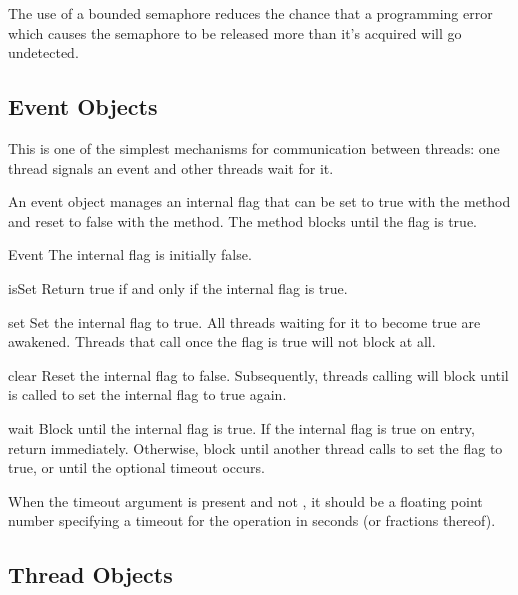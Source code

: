 The use of a bounded semaphore reduces the chance that a programming error
which causes the semaphore to be released more than it's acquired will go
undetected.


\subsection{Event Objects \label{event-objects}}

This is one of the simplest mechanisms for communication between
threads: one thread signals an event and other threads wait for it.

An event object manages an internal flag that can be set to true with
the  method and reset to false with the 
method.  The  method blocks until the flag is true.


\begin{classdesc}{Event}{}
The internal flag is initially false.
\end{classdesc}

\begin{methoddesc}{isSet}{}
Return true if and only if the internal flag is true.
\end{methoddesc}

\begin{methoddesc}{set}{}
Set the internal flag to true.
All threads waiting for it to become true are awakened.
Threads that call  once the flag is true will not block
at all.
\end{methoddesc}

\begin{methoddesc}{clear}{}
Reset the internal flag to false.
Subsequently, threads calling  will block until
 is called to set the internal flag to true again.
\end{methoddesc}

\begin{methoddesc}{wait}{}
Block until the internal flag is true.
If the internal flag is true on entry, return immediately.  Otherwise,
block until another thread calls  to set the flag to
true, or until the optional timeout occurs.

When the timeout argument is present and not , it should be a
floating point number specifying a timeout for the operation in
seconds (or fractions thereof).
\end{methoddesc}


\subsection{Thread Objects \label{thread-objects}}

